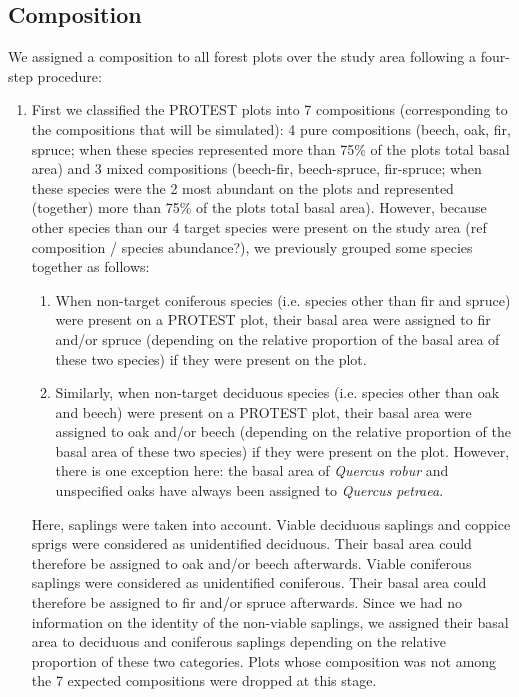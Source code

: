 \documentclass[a4paper]{article}
\begin{document}

\subsection*{Composition}

We assigned a composition to all forest plots over the study area following a four-step procedure:

\begin{enumerate}

    \item First we classified the PROTEST plots into 7 compositions (corresponding to the compositions that will be simulated): 4 pure compositions (beech, oak, fir, spruce; when these species represented more than 75\% of the plots total basal area) and 3 mixed compositions (beech-fir, beech-spruce, fir-spruce; when these species were the 2 most abundant on the plots and represented (together) more than 75\% of the plots total basal area). However, because other species than our 4 target species were present on the study area (ref composition / species abundance?), we previously grouped some species together as follows:

    \begin{enumerate}

        \item When non-target coniferous species (i.e. species other than fir and spruce) were present on a PROTEST plot, their basal area were assigned to fir and/or spruce (depending on the relative proportion of the basal area of these two species) if they were present on the plot.

        \item Similarly, when non-target deciduous species (i.e. species other than oak and beech) were present on a PROTEST plot, their basal area were assigned to oak and/or beech (depending on the relative proportion of the basal area of these two species) if they were present on the plot. However, there is one exception here: the basal area of \textit{Quercus robur} and unspecified oaks have always been assigned to \textit{Quercus petraea}.

    \end{enumerate}

    Here, saplings were taken into account. Viable deciduous saplings and coppice sprigs were considered as unidentified deciduous. Their basal area could therefore be assigned to oak and/or beech afterwards. Viable coniferous saplings were considered as unidentified coniferous. Their basal area could therefore be assigned to fir and/or spruce afterwards. Since we had no information on the identity of the non-viable saplings, we assigned their basal area to deciduous and coniferous saplings depending on the relative proportion of these two categories. Plots whose composition was not among the 7 expected compositions were dropped at this stage.


\end{enumerate}
\end{document}

